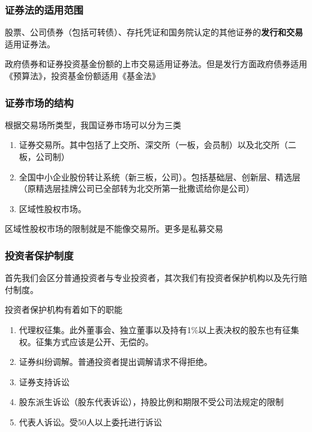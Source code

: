 \documentclass[UTF8,12pt]{ctexart}
\numberwithin{equation}{section} %
\numberwithin{figure}{section}
\numberwithin{table}{section}
\begin{document}
	\subsubsection{证券法的适用范围}
	股票、公司债券（包括可转债）、存托凭证和国务院认定的其他证券的\textbf{发行和交易}适用证券法。
	
	政府债券和证券投资基金份额的上市交易适用证券法。但是发行方面政府债券适用《预算法》，投资基金份额适用《基金法》
	
	\subsubsection{证券市场的结构}
	
	
	根据交易场所类型，我国证券市场可以分为三类
	\begin{enumerate}
		\item 证券交易所。其中包括了上交所、深交所（一板，会员制）以及北交所（二板，公司制）
		
		\item 全国中小企业股份转让系统（新三板，公司）。包括基础层、创新层、精选层（原精选层挂牌公司已全部转为北交所第一批撒谎给你是公司）
		
		\item 区域性股权市场。
	\end{enumerate}
	
	区域性股权市场的限制就是不能像交易所。更多是私募交易
	
	\subsubsection{投资者保护制度}
	首先我们会区分普通投资者与专业投资者，其次我们有投资者保护机构以及先行赔付制度。
	
	投资者保护机构有着如下的职能
	\begin{enumerate}
		\item 代理权征集。此外董事会、独立董事以及持有1\%以上表决权的股东也有征集权。征集方式应该是公开、无偿的。
		
		\item 证券纠纷调解。普通投资者提出调解请求不得拒绝。
		
		\item 证券支持诉讼
		
		\item 股东派生诉讼（股东代表诉讼），持股比例和期限不受公司法规定的限制
		
		\item 代表人诉讼。受50人以上委托进行诉讼
	\end{enumerate}
	
\end{document}
